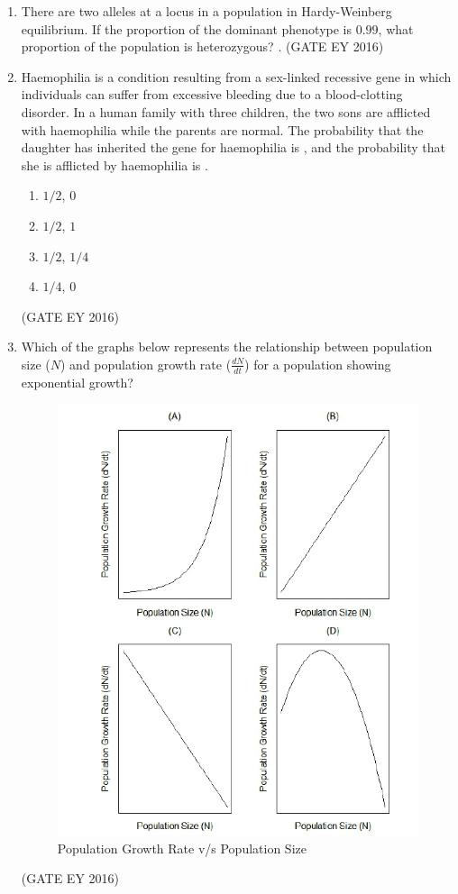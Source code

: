 \documentclass[journal]{IEEEtran}
\begin{document}
\begin{enumerate}
\item There are two alleles at a locus in a population in Hardy-Weinberg equilibrium. If the proportion of the dominant phenotype is $0.99$, what proportion of the population is heterozygous? \underline{\hspace{3cm}}.
\hfill{(GATE EY 2016)}

\item Haemophilia is a condition resulting from a sex-linked recessive gene in which individuals can suffer from excessive bleeding due to a blood-clotting disorder. In a human family with three children, the two sons are afflicted with haemophilia while the parents are normal. The probability that the daughter has inherited the gene for haemophilia is \underline{\hspace{1cm}}, and the probability that she is afflicted by haemophilia is \underline{\hspace{1cm}}.
\begin{multicols}{2}
\begin{enumerate}
    \item $1/2$, $0$
    \item $1/2$, $1$
    \item $1/2$, $1/4$
    \item $1/4$, $0$
\end{enumerate}
\end{multicols}
\hfill{(GATE EY 2016)}

\item Which of the graphs below represents the relationship between population size ($N$) and population growth rate ($\frac{dN}{dt}$) for a population showing exponential growth? 
\begin{figure}[h]
    \centering
    \includegraphics[width=0.1\columnwidth]{figs/Q-41.png}
    \caption{Population Growth Rate v/s Population Size}
    \label{Fig.5}
\end{figure}

\hfill{(GATE EY 2016)}


\end{enumerate}
\end{document}

